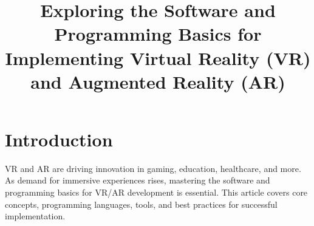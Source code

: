 \documentclass[16pt, a4paper]{article}
\begin{document}
\author{}
\title{Exploring the Software and Programming Basics for Implementing Virtual Reality (VR)
and Augmented Reality (AR)}

\maketitle

\section*{Introduction}
VR and AR are driving innovation in gaming, education, healthcare, and more. As demand for immersive experiences rises, mastering the software and programming basics for VR/AR development is essential. This article covers core concepts, programming languages, tools, and best practices for successful implementation.
\end{document}
